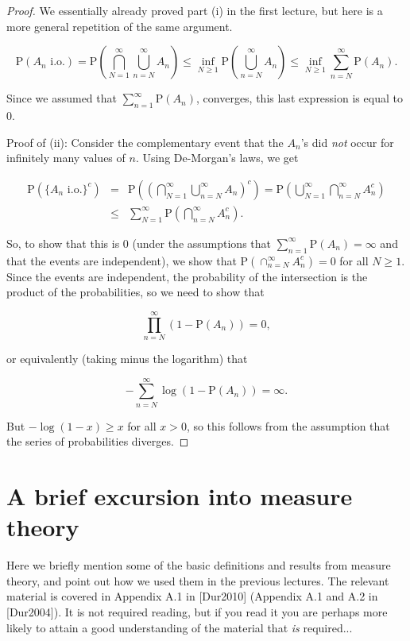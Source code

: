 \documentclass[11pt]{report}
\theoremstyle{plain}
\theoremstyle{definition}
\begin{document}
\begin{proof}
We essentially already proved part (i) in the first
lecture, but here is a more general repetition of the
same argument.

\[
\mathrm{P}(A_n\textrm{ i.o.}) = \mathrm{P}\left(\bigcap_{N=1}^\infty \bigcup_{n=N}^\infty A_n \right)
\le \inf_{N\ge1} \mathrm{P}\left( \bigcup_{n=N}^\infty A_n\right) \le
\inf_{N\ge 1} \sum_{n=N}^\infty \mathrm{P}(A_n).
\]

Since we assumed that
$\sum_{n=1}^\infty \mathrm{P}(A_n)$, converges, this
last expression is equal to $0$.

Proof of (ii): Consider the complementary event that
the $A_n$'s did \emph{not} occur for infinitely many
values of $n$. Using De-Morgan's laws, we get

\begin{eqnarray*}
\mathrm{P}(\{A_n\textrm{ i.o.}\}^c) &=& \mathrm{P}\left(\left(\bigcap_{N=1}^\infty \bigcup_{n=N}^\infty A_n\right)^c \right) = \mathrm{P}\left( \bigcup_{N=1}^\infty \bigcap_{n=N}^\infty A_n^c \right) \\
&\le &\sum_{N=1}^\infty \mathrm{P}\left( \bigcap_{n=N}^\infty A_n^c \right).
\end{eqnarray*}

So, to show that this is 0 (under the assumptions
that $\sum_{n=1}^\infty \mathrm{P}(A_n) = \infty$ and
that the events are independent), we show that
$\mathrm{P}\left( \cap_{n=N}^\infty A_n^c \right) =
0$
for all $N\ge 1$. Since the events are independent,
the probability of the intersection is the product of
the probabilities, so we need to show that

\[
\prod_{n=N}^\infty (1-\mathrm{P}(A_n)) = 0,
\]

or equivalently (taking minus the logarithm) that

\[
-\sum_{n=N}^\infty \log(1-\mathrm{P}(A_n)) = \infty.
\]

But $-\log(1-x) \ge x$ for all $x>0$, so this
follows from the assumption that the series of
probabilities diverges.
\end{proof}

\chapter{A brief excursion into measure theory}
Here we briefly mention some of the basic definitions
and results from measure theory, and point out how we
used them in the previous lectures. The relevant
material is covered in Appendix A.1 in [Dur2010]
(Appendix A.1 and A.2 in [Dur2004]). It is not
required reading, but if you read it you are perhaps
more likely to attain a good understanding of the
material that \emph{is} required...
\end{document}
